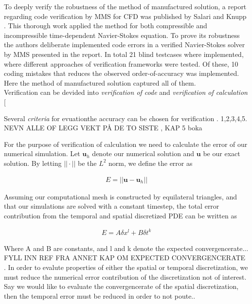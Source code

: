 To deeply verify the robustness of the method of manufactured solution,  a report regarding code verification by MMS for CFD was published by Salari and Knupp \cite{Biggs}. This thorough work applied the method for both compressible and incompressible time-dependent Navier-Stokes equation. To prove its robustness the authors deliberate implemented  code errors in a verified Navier-Stokes solver by MMS presented in the report. In total 21 blind testcases where implemented, where different approaches of verification frameworks were tested. 
Of these, 10 coding mistakes that reduces the observed order-of-accuracy was implemented. Here the method of manufactured solution captured all of them. \\

Verification can be devided into \textit{verification of code} and \textit{verification of calculation} [\cite{Roache2002} \cite{Oberkampf2010}

Several \textit{criteria} for evuationthe accuracy can be chosen for verification \cite{Biggs}.
1,2,3,4,5. NEVN ALLE OF LEGG VEKT PÅ DE TO SISTE , KAP 5 boka

For the purpose of verification of calculation we need to calculate the error of our numerical simulation. Let $\mathbf{u}_h$ denote our numerical solution and $\mathbf{u}$ be our exact solution. By letting $|| \cdot || $ be the  $L^2$ norm, we define the error as

\begin{align*}
E = ||\mathbf{u} - \mathbf{u}_h  ||
\end{align*}

Assuming our computational mesh is constructed by equilateral triangles, and that our simulations are solved with a constant timestep, the total error contribution from the temporal and spatial 
discretized PDE can be written as

\begin{align*}
E = A \delta x^l + B \delta t^k
\end{align*}


Where A and B are constants, and l and k denote the expected convergencerate... FYLL INN REF FRA ANNET KAP OM EXPECTED CONVERGENCERATE \\. In order to evalute properties of either the spatial or temporal discretization, we must reduce the numerical error contribution of the discretization not of interest. Say we would like to evaluate the convergencerate of the spatial discretization, then the temporal error must be reduced in order to not poute.. 

